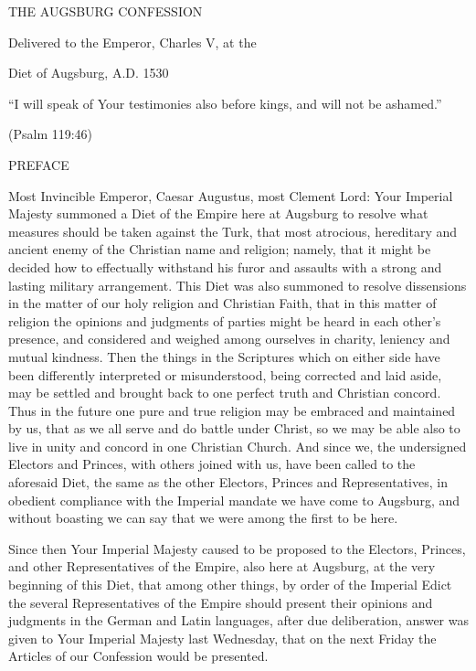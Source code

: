 THE AUGSBURG CONFESSION

Delivered to the Emperor, Charles V, at the

Diet of Augsburg, A.D. 1530

“I will speak of Your testimonies also before kings, and will not be ashamed.”

(Psalm 119:46)

 

 
PREFACE

Most Invincible Emperor, Caesar Augustus, most Clement Lord: Your Imperial Majesty summoned a Diet of the Empire here at Augsburg to resolve what measures should be taken against the Turk, that most atrocious, hereditary and ancient enemy of the Christian name and religion; namely, that it might be decided how to effectually withstand his furor and assaults with a strong and lasting military arrangement. This Diet was also summoned to resolve dissensions in the matter of our holy religion and Christian Faith, that in this matter of religion the opinions and judgments of parties might be heard in each other’s presence, and considered and weighed among ourselves in charity, leniency and mutual kindness. Then the things in the Scriptures which on either side have been differently interpreted or misunderstood, being corrected and laid aside, may be settled and brought back to one perfect truth and Christian concord. Thus in the future one pure and true religion may be embraced and maintained by us, that as we all serve and do battle under Christ, so we may be able also to live in unity and concord in one Christian Church. And since we, the undersigned Electors and Princes, with others joined with us, have been called to the aforesaid Diet, the same as the other Electors, Princes and Representatives, in obedient compliance with the Imperial mandate we have come to Augsburg, and without boasting we can say that we were among the first to be here.

Since then Your Imperial Majesty caused to be proposed to the Electors, Princes, and other Representatives of the Empire, also here at Augsburg, at the very beginning of this Diet, that among other things, by order of the Imperial Edict the several Representatives of the Empire should present their opinions and judgments in the German and Latin languages, after due deliberation, answer was given to Your Imperial Majesty last Wednesday, that on the next Friday the Articles of our Confession would be presented.

